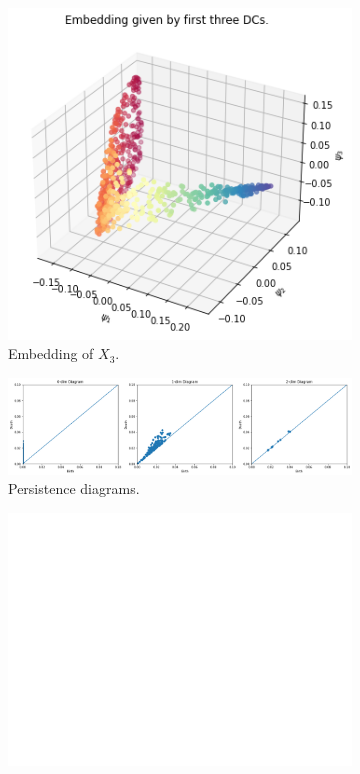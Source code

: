 \begin{figure}[H]
\centering
\begin{subfigure}[b]{0.2\textwidth}
    \includegraphics[width=\textwidth]{figures/topology/X3_embedding.png}
    \caption{Embedding of $X_3$.}
\end{subfigure}
\hfill
\begin{subfigure}[b]{0.75\textwidth}
    \includegraphics[width=\textwidth]{figures/topology/X3_H0.png}
    \caption{Persistence diagrams.}
\end{subfigure}
\begin{subfigure}[b]{0.25\textwidth}
\includegraphics[width=\textwidth]{figures/topology/white.png} 

\end{subfigure}
\end{figure}
